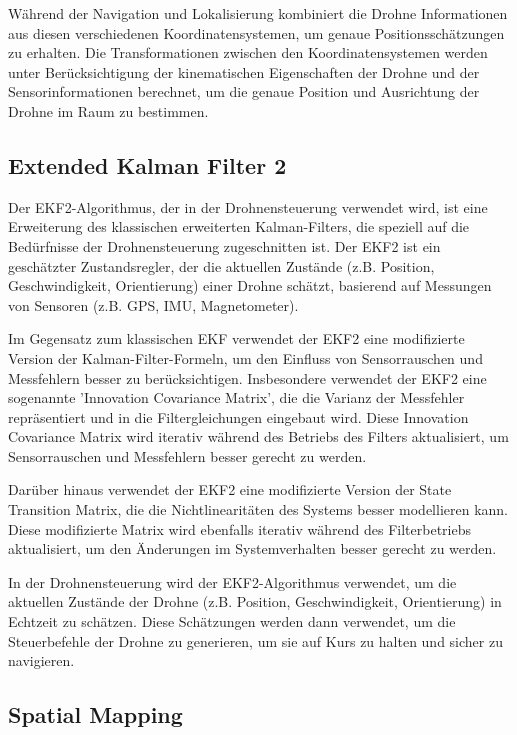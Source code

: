 Während der Navigation und Lokalisierung kombiniert die Drohne Informationen aus diesen verschiedenen Koordinatensystemen, um genaue Positionsschätzungen zu erhalten. Die Transformationen zwischen den Koordinatensystemen werden unter Berücksichtigung der kinematischen Eigenschaften der Drohne und der Sensorinformationen berechnet, um die genaue Position und Ausrichtung der Drohne im Raum zu bestimmen.


    \cite[vgl. ]{SWB-1841134112}

 \subsection{Extended Kalman Filter 2}
    Der \ac{EKF}2-Algorithmus, der in der Drohnensteuerung verwendet wird, ist eine Erweiterung des klassischen erweiterten Kalman-Filters, die speziell auf die Bedürfnisse der Drohnensteuerung zugeschnitten ist. Der EKF2 ist ein geschätzter Zustandsregler, der die aktuellen Zustände (z.B. Position, Geschwindigkeit, Orientierung) einer Drohne schätzt, basierend auf Messungen von Sensoren (z.B. \ac{GPS}, \ac{IMU}, Magnetometer).

Im Gegensatz zum klassischen EKF verwendet der EKF2 eine modifizierte Version der Kalman-Filter-Formeln, um den Einfluss von Sensorrauschen und Messfehlern besser zu berücksichtigen. Insbesondere verwendet der EKF2 eine sogenannte 'Innovation Covariance Matrix', die die Varianz der Messfehler repräsentiert und in die Filtergleichungen eingebaut wird. Diese Innovation Covariance Matrix wird iterativ während des Betriebs des Filters aktualisiert, um Sensorrauschen und Messfehlern besser gerecht zu werden.

Darüber hinaus verwendet der EKF2 eine modifizierte Version der State Transition Matrix, die die Nichtlinearitäten des Systems besser modellieren kann. Diese modifizierte Matrix wird ebenfalls iterativ während des Filterbetriebs aktualisiert, um den Änderungen im Systemverhalten besser gerecht zu werden.

In der Drohnensteuerung wird der EKF2-Algorithmus verwendet, um die aktuellen Zustände der Drohne (z.B. Position, Geschwindigkeit, Orientierung) in Echtzeit zu schätzen. Diese Schätzungen werden dann verwendet, um die Steuerbefehle der Drohne zu generieren, um sie auf Kurs zu halten und sicher zu navigieren.
    
    \subsection{Spatial Mapping} \label{spatial_mapping:subsection}

